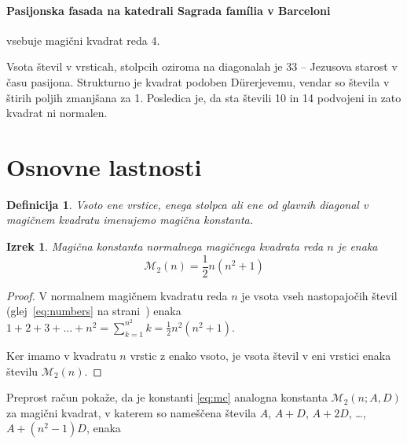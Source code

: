 \documentclass[a4paper,12pt]{article}
\newcommand{\m}{\mathcal{M}}
\newtheorem{izrek}{Izrek}
\newtheorem{definicija}{Definicija}
\begin{document}
\paragraph{Pasijonska fasada na katedrali Sagrada família v Barceloni}
vsebuje magični kvadrat reda 4.

Vsota števil v vrsticah, stolpcih oziroma na diagonalah je 33 -- Jezusova starost
v času pasijona. Strukturno je kvadrat podoben Dürerjevemu, vendar so števila
v štirih poljih zmanjšana za 1. Posledica je, da sta števili 10 in 14 podvojeni
in zato kvadrat ni normalen.


\section{Osnovne lastnosti}

\begin{definicija}
      Vsoto ene vrstice, enega stolpca ali ene od glavnih diagonal
      v magičnem kvadratu imenujemo \emph{magična konstanta}.
\end{definicija}

\begin{izrek}
   Magična konstanta normalnega magičnega kvadrata reda \(n\)
   je enaka
   \begin{equation}
      \m_2(n)= \frac{1}{2}n(n^2 + 1)
      \label{eq:mc}
   \end{equation}
\end{izrek}


\begin{proof}
   V normalnem magičnem kvadratu reda \(n\) je vsota vseh nastopajočih
   števil (glej~\ref{eq:numbers} na strani~\pageref{eq:numbers}) enaka \(1 + 2 + 3 + ... + n^2 = \sum_{k=1}^{n^2}k =\frac{1}{2}n^2(n^2 + 1)\). 
      
   Ker imamo v kvadratu \(n\) vrstic z enako vsoto, je vsota števil v eni vrstici
   enaka številu \(\mathcal{M}_2(n)\).
\end{proof} %


Preprost račun pokaže, da je konstanti \eqref{eq:mc} analogna konstanta
\(\mathcal{M}_2(n;A,D)\) za magični kvadrat, v katerem so nameščena števila
\(A\), \(A+D\), \(A+2D\), \ldots, \(A+(n^2-1)D\), enaka %
\end{document}

